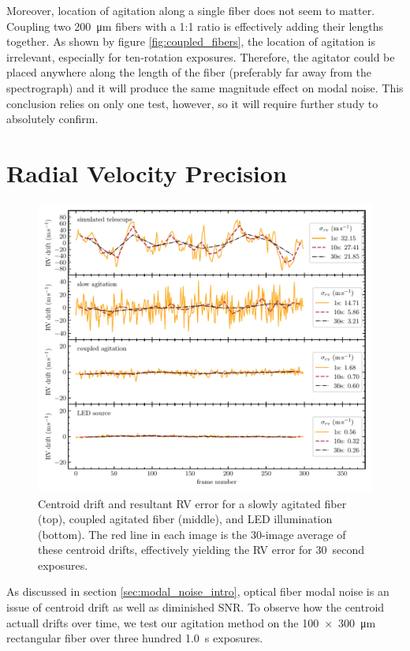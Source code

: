 \documentclass[twocolumn]{emulateapj}
\begin{document}
Moreover, location of agitation along a single fiber does not seem to matter. Coupling two \SI{200}{\micro\meter} fibers with a 1:1 ratio is effectively adding their lengths together. As shown by figure \ref{fig:coupled_fibers}, the location of agitation is irrelevant, especially for ten-rotation exposures. Therefore, the agitator could be placed anywhere along the length of the fiber (preferably far away from the spectrograph) and it will produce the same magnitude effect on modal noise. This conclusion relies on only one test, however, so it will require further study to absolutely confirm.

\section{Radial Velocity Precision}
\label{sec:rv_precision}

\begin{figure}
\centering
	\includegraphics[width=\textwidth]{images/rv_error.pdf}
	\caption{Centroid drift and resultant RV error for a slowly agitated fiber (top), coupled agitated fiber (middle), and LED illumination (bottom). The red line in each image is the 30-image average of these centroid drifts, effectively yielding the RV error for \SI{30}{second} exposures.}
\label{fig:rv_error}
\end{figure}

As discussed in section \ref{sec:modal_noise_intro}, optical fiber modal noise is an issue of centroid drift as well as diminished SNR. To observe how the centroid actuall drifts over time, we test our agitation method on the \SI{100x300}{\micro\meter} rectangular fiber over three hundred \SI{1.0}{\second} exposures.
\end{document}
